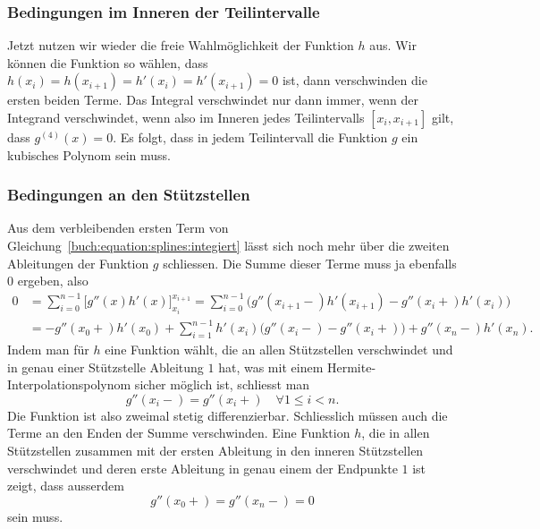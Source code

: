 \subsubsection{Bedingungen im Inneren der Teilintervalle}
Jetzt nutzen wir wieder die freie Wahlmöglichkeit der Funktion $h$
aus.
Wir können die Funktion so wählen, dass
$h(x_i)=h(x_{i+1})=h'(x_i)=h'(x_{i+1})=0$ ist, dann 
verschwinden die ersten beiden Terme.
Das Integral verschwindet nur dann immer, wenn der Integrand verschwindet,
wenn also im Inneren jedes Teilintervalls $[x_i,x_{i+1}]$
gilt, dass
$g^{(4)}(x)=0$.
Es folgt, dass in jedem Teilintervall die Funktion $g$ ein kubisches Polynom 
sein muss.

%
%
\subsubsection{Bedingungen an den Stützstellen}
Aus dem verbleibenden ersten Term von
Gleichung~\eqref{buch:equation:splines:integiert}
lässt sich noch mehr über die zweiten Ableitungen der Funktion $g$
schliessen.
Die Summe dieser Terme muss ja ebenfalls $0$ ergeben, also
\begin{align*}
0
&=
\sum_{i=0}^{n-1} 
\biggl[ g''(x) h'(x) \biggr]_{x_i}^{x_{i+1}}
=
\sum_{i=0}^{n-1}
\bigl( g''(x_{i+1}-) h'(x_{i+1}) - g''(x_i+) h'(x_i) \bigr)
\\
&=
-g''(x_0+)h'(x_0)
+
\sum_{i=1}^{n-1} h'(x_i) \bigl(g''(x_i-) - g''(x_i+)\bigr)
+
g''(x_n-)h'(x_n).
\end{align*}
Indem man für $h$ eine Funktion wählt, die an allen Stützstellen verschwindet
und in genau einer Stützstelle Ableitung $1$ hat, was mit einem
Hermite-Interpolationspolynom sicher möglich ist, schliesst man
\begin{equation}
g''(x_i-)=g''(x_i+)\quad\forall 1\le i< n.
\label{buch:equation:splineinner}
\end{equation}
Die Funktion ist also zweimal stetig differenzierbar.
Schliesslich müssen auch die Terme an den Enden der Summe verschwinden.
Eine Funktion $h$, die in allen Stützstellen zusammen mit der ersten
Ableitung in den inneren Stützstellen verschwindet und deren
erste Ableitung in genau einem der Endpunkte $1$ ist zeigt,
dass ausserdem
\begin{equation}
g''(x_0+) = g''(x_n-) = 0
\label{buch:equation:splinerand}
\end{equation}
sein muss.

%
%

